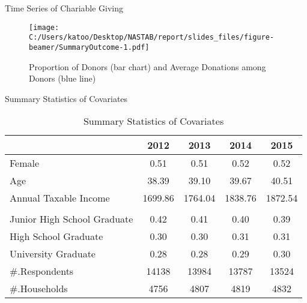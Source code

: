 \documentclass[
  ignorenonframetext,
]{beamer}
\begin{document}
\begin{frame}{Time Series of Chariable Giving}
\protect\hypertarget{time-series-of-chariable-giving}{}
\begin{figure}
\centering
\texttt{[image: C:/Users/katoo/Desktop/NASTAB/report/slides\_files/figure-beamer/SummaryOutcome-1.pdf]}
\caption{Proportion of Donors (bar chart) and Average Donations among
Donors (blue line)}
\end{figure}
\end{frame}

\begin{frame}{Summary Statistics of Covariates}
\protect\hypertarget{summary-statistics-of-covariates}{}
\begin{table}

\caption{\label{tab:kableSummaryCovariate}Summary Statistics of Covariates}
\centering
\fontsize{9}{11}\selectfont
\begin{tabular}[t]{lcccc}
\toprule
 & 2012 & 2013 & 2014 & 2015\\
\midrule
Female & 0.51 & 0.51 & 0.52 & 0.52\\
Age & 38.39 & 39.10 & 39.67 & 40.51\\
Annual Taxable Income & 1699.86 & 1764.04 & 1838.76 & 1872.54\\
\addlinespace[0.3em]
\multicolumn{5}{l}{\textbf{Education}}\\
\hspace{1em}Junior High School Graduate & 0.42 & 0.41 & 0.40 & 0.39\\
\hspace{1em}High School Graduate & 0.30 & 0.30 & 0.31 & 0.31\\
\hspace{1em}University Graduate & 0.28 & 0.28 & 0.29 & 0.30\\
\#.Respondents & 14138 & 13984 & 13787 & 13524\\
\#.Households & 4756 & 4807 & 4819 & 4832\\
\bottomrule
\end{tabular}
\end{table}
\end{frame}
\end{document}
